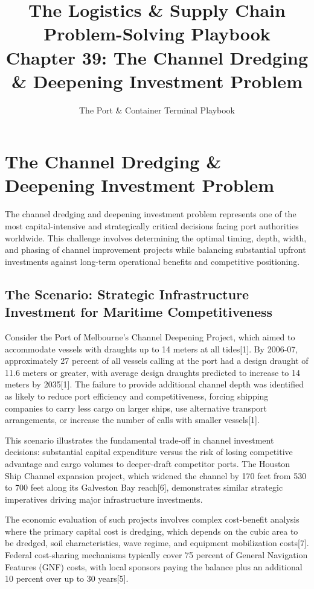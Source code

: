 \documentclass{article}
\title{The Logistics \& Supply Chain Problem-Solving Playbook\\
Chapter 39: The Channel Dredging \& Deepening Investment Problem}
\author{The Port \& Container Terminal Playbook}
\date{}
\begin{document}
\maketitle

\section{The Channel Dredging \& Deepening Investment Problem}

The channel dredging and deepening investment problem represents one of the most capital-intensive and strategically critical decisions facing port authorities worldwide. This challenge involves determining the optimal timing, depth, width, and phasing of channel improvement projects while balancing substantial upfront investments against long-term operational benefits and competitive positioning.

\subsection{The Scenario: Strategic Infrastructure Investment for Maritime Competitiveness}

Consider the Port of Melbourne's Channel Deepening Project, which aimed to accommodate vessels with draughts up to 14 meters at all tides[1]. By 2006-07, approximately 27 percent of all vessels calling at the port had a design draught of 11.6 meters or greater, with average design draughts predicted to increase to 14 meters by 2035[1]. The failure to provide additional channel depth was identified as likely to reduce port efficiency and competitiveness, forcing shipping companies to carry less cargo on larger ships, use alternative transport arrangements, or increase the number of calls with smaller vessels[1].

This scenario illustrates the fundamental trade-off in channel investment decisions: substantial capital expenditure versus the risk of losing competitive advantage and cargo volumes to deeper-draft competitor ports. The Houston Ship Channel expansion project, which widened the channel by 170 feet from 530 to 700 feet along its Galveston Bay reach[6], demonstrates similar strategic imperatives driving major infrastructure investments.

The economic evaluation of such projects involves complex cost-benefit analysis where the primary capital cost is dredging, which depends on the cubic area to be dredged, soil characteristics, wave regime, and equipment mobilization costs[7]. Federal cost-sharing mechanisms typically cover 75 percent of General Navigation Features (GNF) costs, with local sponsors paying the balance plus an additional 10 percent over up to 30 years[5].
\end{document}
